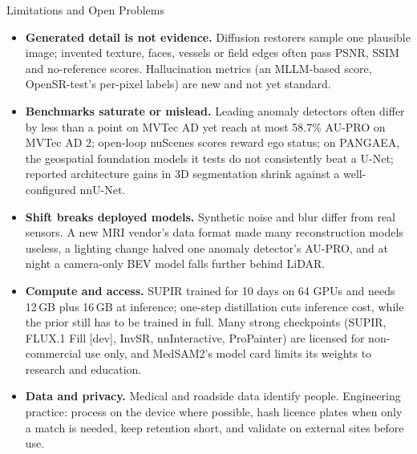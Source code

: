 \begin{frame}{Limitations and Open Problems}
  \begin{itemize}\footnotesize\itemsep0.45em
    \item \textbf{Generated detail is not evidence.} Diffusion restorers sample one plausible image; invented texture, faces, vessels or field edges often pass PSNR, SSIM and no-reference scores. Hallucination metrics (an MLLM-based score, OpenSR-test's per-pixel labels) are new and not yet standard.
    \item \textbf{Benchmarks saturate or mislead.} Leading anomaly detectors often differ by less than a point on MVTec AD yet reach at most 58.7\% AU-PRO on MVTec AD 2; open-loop nuScenes scores reward ego status; on PANGAEA, the geospatial foundation models it tests do not consistently beat a U-Net; reported architecture gains in 3D segmentation shrink against a well-configured nnU-Net.
    \item \textbf{Shift breaks deployed models.} Synthetic noise and blur differ from real sensors. A new MRI vendor's data format made many reconstruction models useless, a lighting change halved one anomaly detector's AU-PRO, and at night a camera-only BEV model falls further behind LiDAR.
    \item \textbf{Compute and access.} SUPIR trained for 10 days on 64 GPUs and needs 12\,GB plus 16\,GB at inference; one-step distillation cuts inference cost, while the prior still has to be trained in full. Many strong checkpoints (SUPIR, FLUX.1 Fill [dev], InvSR, nnInteractive, ProPainter) are licensed for non-commercial use only, and MedSAM2's model card limits its weights to research and education.
    \item \textbf{Data and privacy.} Medical and roadside data identify people. Engineering practice: process on the device where possible, hash licence plates when only a match is needed, keep retention short, and validate on external sites before use.
  \end{itemize}
\end{frame}
